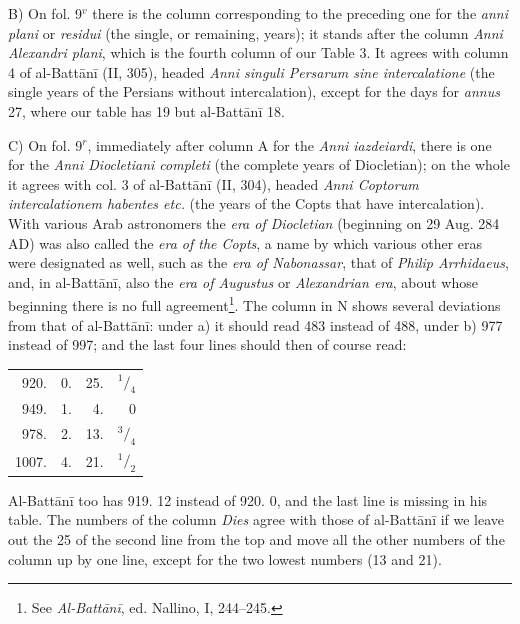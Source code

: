 \documentclass[11pt]{article}
\newcommand{\Pg}[1]{\marginpar{\footnotesize\color{gray}#1}}
\begin{document}
\par B) On fol. 9$^{v}$ there is the column corresponding to the preceding one for the \emph{anni plani} or \emph{residui} (the single, or remaining, years); it stands after the column \emph{Anni Alexandri plani}, which is the fourth column of our Table 3. It agrees with column 4 of al-Battānī (II, 305), headed \emph{Anni singuli Persarum sine intercalatione} (the single years of the Persians without intercalation), except for the days for \emph{annus} 27, where our table has 19 but al-Battānī 18.\par
\par \Pg{XVI}C) On fol. 9$^{r}$, immediately after column A for the \emph{Anni iazdeiardi}, there is one for the \emph{Anni Diocletiani completi} (the complete years of Diocletian); on the whole it agrees with col. 3 of al-Battānī (II, 304), headed \emph{Anni Coptorum intercalationem habentes etc.} (the years of the Copts that have intercalation). With various Arab astronomers the \emph{era of Diocletian} (beginning on 29 Aug. 284 AD) was also called the \emph{era of the Copts}, a name by which various other eras were designated as well, such as the \emph{era of Nabonassar}, that of \emph{Philip Arrhidaeus}, and, in al-Battānī, also the \emph{era of Augustus} or \emph{Alexandrian era}, about whose beginning there is no full agreement\footnote{See \emph{Al-Battānī}, ed. Nallino, I, 244–245.}. The column in N shows several deviations from that of al-Battānī: under a) it should read 483 instead of 488, under b) 977 instead of 997; and the last four lines should then of course read:\par
\begin{center}\small\begin{tabular}{rrrr}
920. & 0. & 25. & $^{1}/_{4}$ \\
949. & 1. & 4. & 0 \\
978. & 2. & 13. & $^{3}/_{4}$ \\
1007. & 4. & 21. & $^{1}/_{2}$ \\
\end{tabular}\end{center}
\par Al-Battānī too has 919. 12 instead of 920. 0, and the last line is missing in his table. The numbers of the column \emph{Dies} agree with those of al-Battānī if we leave out the 25 of the second line from the top and move all the other numbers of the column up by one line, except for the two lowest numbers (13 and 21).\par
\end{document}
